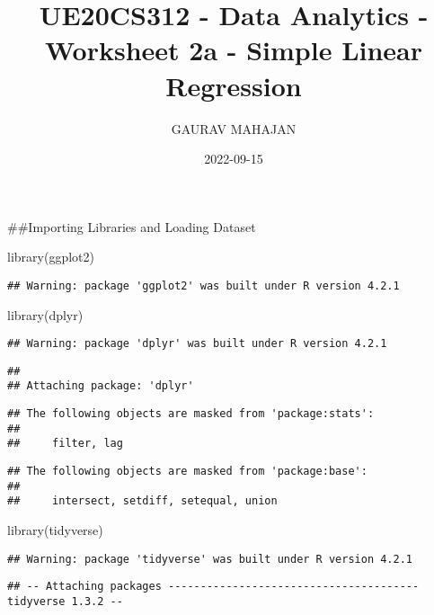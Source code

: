 \documentclass[
]{article}
\title{UE20CS312 - Data Analytics - Worksheet 2a - Simple Linear
Regression}
\author{GAURAV MAHAJAN}
\date{2022-09-15}
\newenvironment{Shaded}{\begin{snugshade}}{\end{snugshade}}
\newcommand{\FunctionTok}[1]{\textcolor[rgb]{0.00,0.00,0.00}{#1}}
\newcommand{\NormalTok}[1]{#1}
\begin{document}
\maketitle

\#\#Importing Libraries and Loading Dataset

\begin{Shaded}
\begin{Highlighting}[]
\FunctionTok{library}\NormalTok{(ggplot2)}
\end{Highlighting}
\end{Shaded}

\begin{verbatim}
## Warning: package 'ggplot2' was built under R version 4.2.1
\end{verbatim}

\begin{Shaded}
\begin{Highlighting}[]
\FunctionTok{library}\NormalTok{(dplyr)}
\end{Highlighting}
\end{Shaded}

\begin{verbatim}
## Warning: package 'dplyr' was built under R version 4.2.1
\end{verbatim}

\begin{verbatim}
## 
## Attaching package: 'dplyr'
\end{verbatim}

\begin{verbatim}
## The following objects are masked from 'package:stats':
## 
##     filter, lag
\end{verbatim}

\begin{verbatim}
## The following objects are masked from 'package:base':
## 
##     intersect, setdiff, setequal, union
\end{verbatim}

\begin{Shaded}
\begin{Highlighting}[]
\FunctionTok{library}\NormalTok{(tidyverse)}
\end{Highlighting}
\end{Shaded}

\begin{verbatim}
## Warning: package 'tidyverse' was built under R version 4.2.1
\end{verbatim}

\begin{verbatim}
## -- Attaching packages --------------------------------------- tidyverse 1.3.2 --
\end{verbatim}
\end{document}
